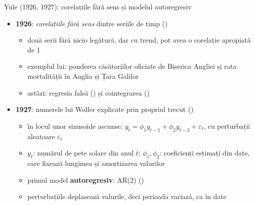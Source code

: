 \begin{frame}{Yule (1926, 1927): corelațiile fără sens și modelul autoregresiv}
\itemsize{\small}
\begin{itemize}
    \item \textbf{1926}: \emph{corelațiile fără sens} dintre seriile de timp ()
    \begin{itemize}
        \item două serii fără nicio legătură, dar cu trend, pot avea o corelație apropiată de 1
        \item exemplul lui: ponderea căsătoriilor oficiate de Biserica Angliei și rata mortalității în Anglia și Țara Galilor
        \item astăzi: regresia falsă () și cointegrarea ()
    \end{itemize}
    \item \textbf{1927}: numerele lui Wolfer explicate prin propriul trecut ()
    \begin{itemize}
        \item în locul unor sinusoide ascunse: $y_t = \phi_1 y_{t-1} + \phi_2 y_{t-2} + \varepsilon_t$, cu perturbații aleatoare $\varepsilon_t$
        \item $y_t$: numărul de pete solare din anul $t$; $\phi_1, \phi_2$: coeficienți estimați din date, care fixează lungimea și amortizarea valurilor
        \item primul model \textbf{autoregresiv}: AR(2) ()
        \item perturbațiile deplasează valurile, deci perioada variază, ca în date
    \end{itemize}
\end{itemize}
\end{frame}

